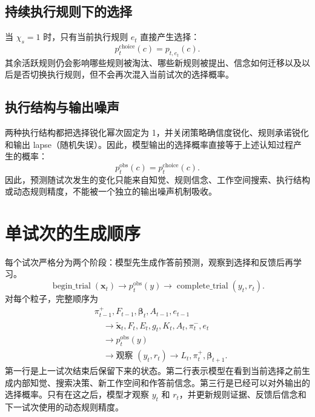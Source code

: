 \documentclass[12pt]{article}
\begin{document}
\subsection{持续执行规则下的选择}

当 $\chi_s=1$ 时，只有当前执行规则 $e_t$ 直接产生选择：
\begin{equation}
p_t^{\mathrm{choice}}(c)=p_{t,e_t}(c).
\label{eq:choice-execution-on}
\end{equation}
其余活跃规则仍会影响哪些规则被淘汰、哪些新规则被提出、信念如何迁移以及以后是否切换执行规则，但不会再次混入当前试次的选择概率。

\subsection{执行结构与输出噪声}

两种执行结构都把选择锐化幂次固定为 1，并关闭策略确信度锐化、规则承诺锐化和输出 lapse（随机失误）。因此，模型输出的选择概率直接等于上述认知过程产生的概率：
\begin{equation}
p_t^{\mathrm{obs}}(c)=p_t^{\mathrm{choice}}(c).
\label{eq:no-output-noise}
\end{equation}
因此，预测随试次发生的变化只能来自知觉、规则信念、工作空间搜索、执行结构或动态规则精度，不能被一个独立的输出噪声机制吸收。


\section{单试次的生成顺序}

每个试次严格分为两个阶段：模型先生成作答前预测，观察到选择和反馈后再学习。
\begin{equation}
\operatorname{begin\_trial}(\bm x_t)
\longrightarrow
p_t^{\mathrm{obs}}(y)
\longrightarrow
\operatorname{complete\_trial}(y_t,r_t).
\label{eq:lifecycle}
\end{equation}
对每个粒子，完整顺序为
\begin{equation}
\begin{aligned}
&\pi_{t-1}^{+},F_{t-1},\bm\beta_t,A_{t-1},e_{t-1}
\\
&\quad\longrightarrow
\widetilde{\bm x}_t,F_t,E_t,g_t,K_t,A_t,\pi_t^{-},e_t
\\
&\quad\longrightarrow
p_t^{\mathrm{obs}}(y)
\\
&\quad\longrightarrow
\text{观察 }(y_t,r_t)
\longrightarrow
L_t,\pi_t^{+},\bm\beta_{t+1}.
\end{aligned}
\label{eq:causal-order}
\end{equation}
第一行是上一试次结束后保留下来的状态。第二行表示模型在看到当前选择之前生成内部知觉、搜索决策、新工作空间和作答前信念。第三行是已经可以对外输出的选择概率。只有在这之后，模型才观察 $y_t$ 和 $r_t$，并更新规则证据、反馈后信念和下一试次使用的动态规则精度。
\end{document}
